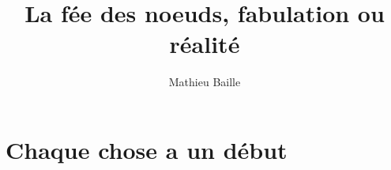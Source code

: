 \documentclass{report}
\title{La fée des noeuds, fabulation ou réalité}
\author{Mathieu Baille}
\begin{document}
\maketitle
\chapter{Chaque chose a un début}
\end{document}
